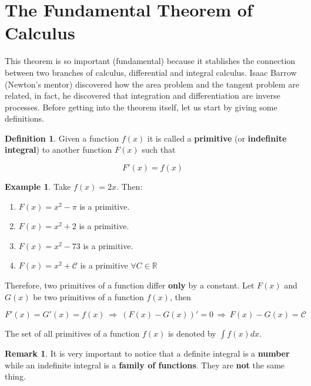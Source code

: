 \documentclass[a4paper,11pt]{article}
\theoremstyle{definition}
\newtheorem{definition}{Definition}
\newtheorem{example}{Example}
\newtheorem{remark}{Remark}
\theoremstyle{plain}
\begin{document}
\section{The Fundamental Theorem of Calculus}\label{the-fundamental-theorem-of-calculus}

This theorem is so important (fundamental) because it stablishes the connection between two branches of calculus, differential and integral calculus. Isaac Barrow (Newton's mentor) discovered how the area problem and the tangent problem are related, in fact, he discovered that integration and differentiation are inverse processes. Before getting into the theorem itself, let us start by giving some definitions.

\begin{definition}
Given a function \(f(x)\) it is called a \textbf{primitive} (or \textbf{indefinite integral}) to another function \(F(x)\) such that

\[
F'(x) = f(x)
\]

\end{definition}

\begin{example}
Take \(f(x) = 2x\). Then: 

\begin{enumerate}
	\item \(F(x) = x^2 - \pi\) is a primitive. 
	\item \(F(x) = x^2 + 2\) is a primitive. 
	\item \(F(x) = x^2 - 73\) is a primitive. 
	\item \(F(x) = x^2 + \mathcal{C}\) is a primitive \(\forall C\in\mathbb{R}\)
\end{enumerate}
\end{example}

Therefore, two primitives of a function differ \textbf{only} by a constant. Let \(F(x)\) and \(G(x)\) be two primitives of a function \(f(x)\), then

\[
F'(x) = G'(x) = f(x) \ \Rightarrow \ \left(F(x)-G(x)\right)' = 0 \ \Rightarrow \ F(x) - G(x) = \mathcal{C}
\]

The set of all primitives of a function \(f(x)\) is denoted by \(\displaystyle\int f(x) dx\).

\begin{remark}
It is very important to notice that a definite integral is a \textbf{number} while an indefinite integral is a \textbf{family of functions}. They are \textbf{not} the same thing.
\end{remark}
\end{document}

